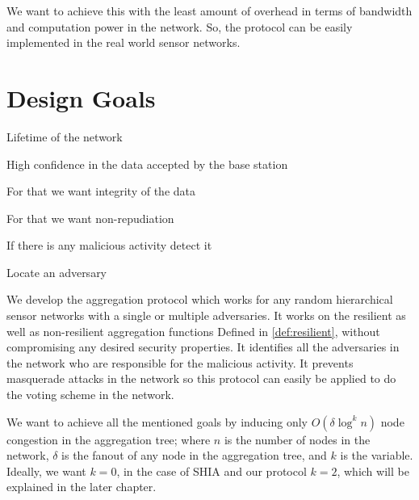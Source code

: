 	We want to achieve this with the least amount of overhead in terms of bandwidth and computation power in the network.
	So, the protocol can be easily implemented in the real world sensor networks.
	

\section{Design Goals}
	Lifetime of the network

	High confidence in the data accepted by the base station

	For that we want integrity of the data

	For that we want non-repudiation

	If there is any malicious activity detect it

	Locate an adversary


	We develop the aggregation protocol which works for any random hierarchical sensor networks with a single or multiple adversaries.
	It works on the resilient as well as non-resilient aggregation functions Defined in \ref{def:resilient}, without compromising any desired security properties.
	It identifies all the adversaries in the network who are responsible for the malicious activity.
	It prevents masquerade attacks in the network so this protocol can easily be applied to do the voting scheme in the network.

	We want to achieve all the mentioned goals by inducing only $O(\delta \log^{k} n)$ node congestion in the aggregation tree; where $n$ is the number of nodes in the network, $\delta$ is the fanout of any node in the aggregation tree, and $k$ is the variable.
	Ideally, we want $k=0$, in the case of SHIA and our protocol $k=2$, which will be explained in the later chapter.

